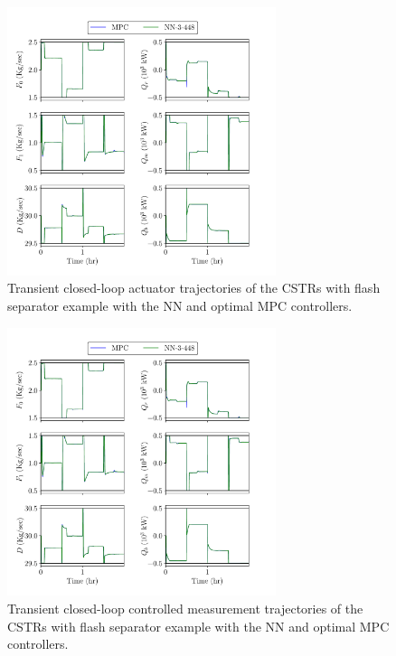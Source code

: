 \documentclass[preprint,5p, twocolumn, authoryear]{elsarticle}
\begin{document}
\begin{figure}[!h]
    \centering
	\includegraphics[page=1, 
		width=0.7\textwidth, 
        height=0.5\textheight]{cstrs_comparision_plots.pdf}    
        \caption{Transient closed-loop actuator trajectories of the CSTRs with 
        flash separator example with the NN and optimal MPC controllers.}   
    \label{fig:cl_cstrs_inputs}
\end{figure}

\begin{figure}[!h]
    \centering
	\includegraphics[page=2, 
		width=0.7\textwidth, 
		height=0.5\textheight]{cstrs_comparision_plots.pdf}
        \caption{Transient closed-loop controlled measurement 
        trajectories of the CSTRs with 
        flash separator example with the NN and optimal MPC controllers.}      \label{fig:cl_cstrs_outputs}
\end{figure}
\end{document}

